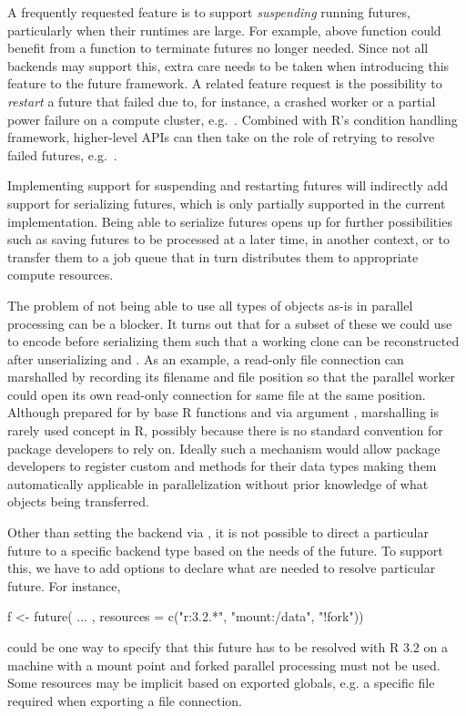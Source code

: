 A frequently requested feature is to support \emph{suspending} running
futures, particularly when their runtimes are large.  For example,
above  function could benefit from
a  function to terminate futures no longer needed.
Since not all backends may support
this, extra care needs to be taken when introducing this feature to
the future framework.  A related feature request is the possibility
to \emph{restart} a future that failed due to, for instance, a crashed
worker or a partial power failure on a compute cluster,
e.g.\ .  Combined with R's condition handling
framework, higher-level APIs can then take on the role of retrying to
resolve failed futures,
e.g.\ .

Implementing support for suspending and restarting futures will
indirectly add support for serializing futures, which is only
partially supported in the current implementation.  Being able to
serialize futures opens up for further possibilities such as saving
futures to be processed at a later time, in another context, or to
transfer them to a job queue that in turn distributes them to
appropriate compute resources.

The problem of not being able to use all types of objects as-is in
parallel processing can be a blocker.  It turns out that for a subset
of these we could use  to encode before serializing
them such that a working clone can be reconstructed after
unserializing and .  As an example, a read-only
file connection can marshalled by recording its filename and file
position so that the parallel worker could open its own read-only
connection for same file at the same position.  Although prepared for
by base R functions  and  via
argument , marshalling is rarely used concept in R,
possibly because there is no standard convention for package
developers to rely on. Ideally such a mechanism would allow package
developers to register custom  and 
methods for their data types making them automatically applicable in
parallelization without prior knowledge of what objects being
transferred.

Other than setting the backend via , it is not possible
to direct a particular future to a specific backend type based on the
needs of the future.  To support this, we have to add options to
declare what  are needed to resolve particular future.
For instance,
\begin{example}
f <- future({ ... }, resources = c("r:3.2.*", "mount:/data", "!fork"))
\end{example}
%
could be one way to specify that this future has to be resolved with R
3.2 on a machine with a  mount point and forked parallel
processing must not be used.  Some resources may be implicit based on
exported globals, e.g. a specific file required when exporting a file
connection.

